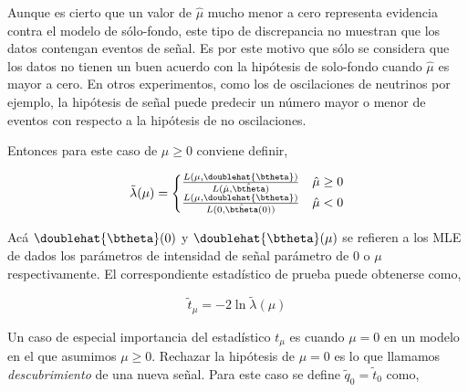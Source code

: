 
Aunque es cierto que un valor de $\hat{\mu}$ mucho menor a cero representa
evidencia contra el modelo de sólo-fondo, este tipo de discrepancia no muestran
que los datos contengan eventos de señal. Es por este motivo que sólo se
considera que los datos no tienen un buen acuerdo con la hipótesis de solo-fondo cuando $\hat{\mu}$ es mayor a cero.
En otros experimentos, como los de  oscilaciones de neutrinos por ejemplo, la
hipótesis de señal puede predecir un número mayor o menor de eventos con
respecto a la hipótesis de no oscilaciones.

Entonces para este  caso de $\mu \geq 0$ conviene definir,

\begin{equation}
  \tilde{\lambda}(\mu) =
  \begin{cases}
    \frac{L(\mu, \doublehat{\btheta})}{L(\hat{\mu}, \hat{\btheta})} & \hat{\mu} \geq 0 \\
    \frac{L(\mu, \doublehat{\btheta})}{L(0, \hat{\btheta}(0))} & \hat{\mu} < 0
  \end{cases}
\end{equation}

Acá $\doublehat{\btheta}(0)$ y $\doublehat{\btheta}(\mu)$ se refieren a los MLE
de {\btheta} dados los parámetros de intensidad de señal parámetro de 0 o $\mu$
respectivamente. El correspondiente estadístico de prueba puede obtenerse como,

\begin{equation}
  \tilde{t}_\mu = -2 \ln \tilde{\lambda}(\mu) %
\end{equation}

Un caso de especial importancia del estadístico $t_\mu$ es cuando $\mu=0$ en un
modelo en el que asumimos $\mu \geq 0$. Rechazar la hipótesis de $\mu=0$ es lo
que llamamos \emph{descubrimiento} de una nueva señal. Para este caso se define
$\tilde{q}_0=\tilde{t}_0$ como,

